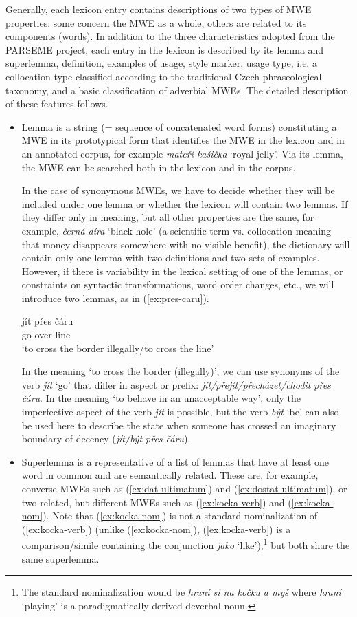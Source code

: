 \documentclass[output=paper,colorlinks,citecolor=brown]{langscibook}
\begin{document}
Generally, each lexicon entry contains descriptions of two types of MWE properties: some concern the MWE as a whole, others are related to its  components (words). In addition to the three characteristics adopted from the PARSEME proj\-ect, each entry in the lexicon is described by its lemma and superlemma, definition, examples of usage,
style marker, usage type, i.e. a collocation type classified according to the traditional Czech phraseological taxonomy, and a basic classification of adverbial MWEs. The detailed description of these features follows.
\begin{itemize}
\item Lemma is a string (= sequence of concatenated word forms) constituting a MWE in its prototypical form that identifies the MWE in the lexicon and in an annotated corpus, for example \emph{mateří kašička} ‘royal jelly’. Via its lemma, the MWE can be searched both in the lexicon and in the corpus.

In the case of synonymous MWEs, we have to decide whether they will be included under one lemma or whether the lexicon will contain two lemmas. If they differ only in meaning, but all other properties are the same, for example, \textit{černá díra} `black hole' (a scientific term vs. collocation meaning that money disappears somewhere with no visible benefit), the dictionary will contain only one lemma with two definitions and two sets of examples. However, if there is variability in the lexical setting of one of the lemmas, or constraints on syntactic transformations, word order changes, etc., we will introduce two lemmas, as in (\ref{ex:pres-caru}).

\ea
\label{ex:pres-caru}
\gll jít přes čáru\\
     go over line\\
\glt `to cross the border illegally\slash to cross the line'
\z

In the meaning `to cross the border (illegally)', we can use synonyms of the verb \emph{jít} `go' that differ in aspect or prefix: \emph{jít/přejít/přecházet/chodit přes čáru}. In the meaning `to behave in an unacceptable way', only the imperfective aspect of the verb \emph{jít} is possible, but the verb \emph{být} `be' can also be used here to describe the state when someone has crossed an imaginary boundary of decency (\emph{jít/být přes čáru}).

\item Superlemma is a representative of a list of lemmas that have at least one word in common and are semantically related. These are, for example, converse MWEs such as (\ref{ex:dat-ultimatum}) and (\ref{ex:dostat-ultimatum}), or two related, but different MWEs such as (\ref{ex:kocka-verb}) and (\ref{ex:kocka-nom}). Note that (\ref{ex:kocka-nom}) is not a standard nominalization of (\ref{ex:kocka-verb}) (unlike (\ref{ex:kocka-nom}), (\ref{ex:kocka-verb}) is a comparison/simile containing the conjunction \emph{jako} ‘like’),\footnote{The standard nominalization would be \emph{hraní si na kočku a myš} where \emph{hraní} ‘playing’ is a paradigmatically derived deverbal noun.} but both share the same superlemma.


\end{itemize}
\end{document}
